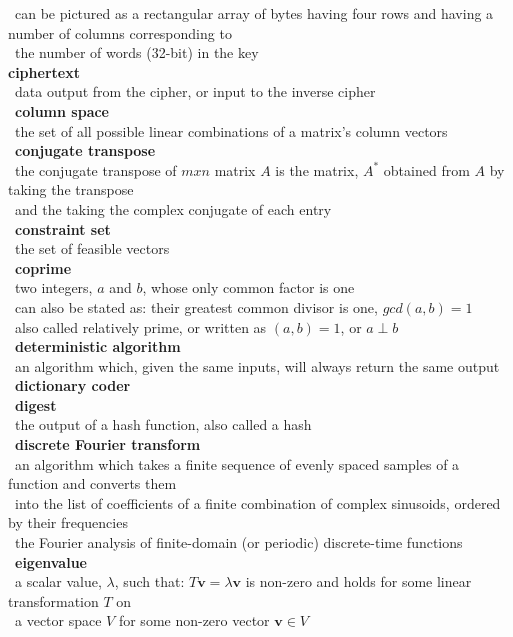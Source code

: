 \documentclass[10pt,letterpaper]{scrartcl}
\newcommand{\tbul}{\textbullet}
\newcommand{\tend}{\>\textendash}
\newcommand{\tasc}{\>\>\textasteriskcentered}
\begin{document}
\begin{tabbing}
\tasc\ can be pictured as a rectangular array of bytes having four rows and having a number of columns corresponding to\\ \>\ the number of words (32-bit) in the key \\
\tbul \textbf{ciphertext} \\
\tend\ data output from the cipher, or input to the inverse cipher \\
\tbul\ \textbf{column space} \\
\tend\ the set of all possible linear combinations of a matrix's column vectors \\
\tbul\ \textbf{conjugate transpose} \\
\tend\ the conjugate transpose of $mxn$ matrix $A$ is the matrix, $A^*$ obtained from $A$ by taking the transpose \\ \>\ and the taking the complex conjugate of each entry \\
\tbul\ \textbf{constraint set} \\
\tend\ the set of feasible vectors \\
\tbul\ \textbf{coprime} \\
\tend\ two integers, $a$ and $b$, whose only common factor is one \\
\tend\ can also be stated as: their greatest common divisor is one, $gcd(a,b)=1$ \\
\tend\ also called relatively prime, or written as $(a,b)=1$, or $a\perp b$ \\
\tbul\ \textbf{deterministic algorithm} \\
\tend\ an algorithm which, given the same inputs, will always return the same output\\
\tbul\ \textbf{dictionary coder} \\
\tbul\ \textbf{digest} \\
\tend\ the output of a hash function, also called a hash \\
\tbul\ \textbf{discrete Fourier transform} \\
\tend\ an algorithm which takes a finite sequence of evenly spaced samples of a function and converts them \\ \>\ into the list of coefficients of a finite combination of complex sinusoids, ordered by their frequencies \\
\tend\ the Fourier analysis of finite-domain (or periodic) discrete-time functions \\
\tbul\ \textbf{eigenvalue} \\
\tend\ a scalar value, $\lambda$, such that: $T\mathbf{v}=\lambda\mathbf{v}$ is non-zero and holds for some linear transformation $T$ on \\ \>\ a vector space $V$ for some non-zero vector $\mathbf{v} \in V$\\

\end{tabbing}
\end{document}
